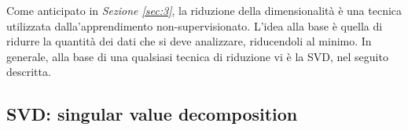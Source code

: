 \documentclass{subfiles}
\begin{document}
Come anticipato in \emph{Sezione \ref{sec:3}}, la riduzione della dimensionalità è una tecnica utilizzata dalla'apprendimento non-supervisionato.
L'idea alla base è quella di ridurre la quantità dei dati che si deve analizzare, riducendoli al minimo.
In generale, alla base di una qualsiasi tecnica di riduzione vi è la SVD, nel seguito descritta.

\subsection{SVD: singular value decomposition}

\clearpage
\end{document}
